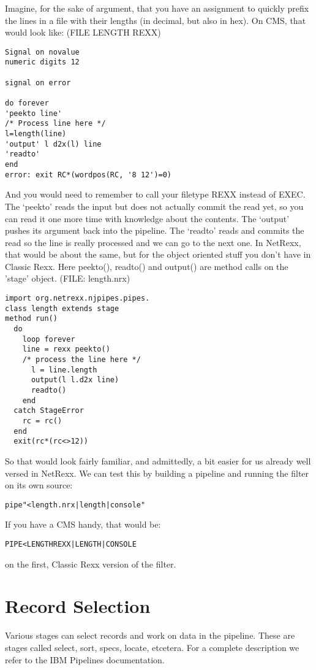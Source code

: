 Imagine, for the sake of argument, that you have an
assignment to quickly prefix the lines in a file with their lengths
(in decimal, but also in hex). On CMS, that would look like: (FILE LENGTH REXX)
\begin{lstlisting}
Signal on novalue
numeric digits 12

signal on error

do forever
'peekto line'
/* Process line here */
l=length(line)
'output' l d2x(l) line
'readto'
end
error: exit RC*(wordpos(RC, '8 12')=0)
\end{lstlisting}
And you would need to remember to call your filetype REXX instead of EXEC.  The ‘peekto’ reads the input but does not actually commit the read yet, so you can read it one more time with knowledge about the contents. The ‘output’ pushes its argument back into the pipeline. The ‘readto’ reads and commits the read so the line is really processed and we can go to the next one.
In NetRexx, that would be about the same, but for the object oriented
stuff you don't have in Classic Rexx. Here peekto(), readto() and
output() are method calls on the ’stage’ object. (FILE: length.nrx)
\begin{lstlisting}
import org.netrexx.njpipes.pipes.
class length extends stage
method run()
  do
    loop forever
    line = rexx peekto()
    /* process the line here */
      l = line.length
      output(l l.d2x line)
      readto()
    end
  catch StageError
    rc = rc()
  end
  exit(rc*(rc<>12))
 \end{lstlisting}
So that would look fairly familiar, and admittedly, a bit easier for us already well versed in NetRexx.
We can test this by building a pipeline and running the filter on its
own source:
\begin{alltt}
pipe "<length.nrx | length | console"
 \end{alltt}
If you have a CMS handy, that would be:
\begin{alltt}
  PIPE < LENGTH REXX | LENGTH | CONSOLE
 \end{alltt}
on the first, Classic Rexx version of the filter.


\chapter{Record Selection}
Various stages can select records and work on data in the
pipeline. These are stages called select, sort, specs, locate,
etcetera. For a complete description we refer to the IBM Pipelines
documentation. 

